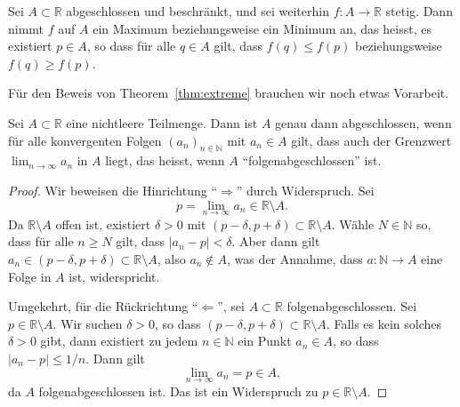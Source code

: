 \documentclass[../main.tex]{subfiles}
\begin{document}
\begin{theorem}\label{thm:extreme}
  Sei $A \subset \mathbb{R}$ abgeschlossen
  und beschränkt,
  und sei weiterhin $f \colon A \to \mathbb{R}$
  stetig. Dann nimmt $f$ auf $A$ ein
  Maximum beziehungsweise ein Minimum an,
  das heisst, es existiert $p \in A$,
  so dass für alle $q \in A$ gilt,
  dass $f(q) \leq f(p)$ beziehungsweise $f(q) \geq f(p)$.
\end{theorem}

Für den Beweis von Theorem~\ref{thm:extreme}
brauchen wir noch etwas Vorarbeit.

\begin{lemma*}[Folgenabgeschlossenheit]
  Sei $A \subset \mathbb{R}$ eine nichtleere Teilmenge.
  Dann ist $A$ genau dann abgeschlossen, wenn für
  alle konvergenten Folgen
  ${(a_{n})}_{n \in \mathbb{N}}$ mit
  $a_n \in A$ gilt, dass auch
  der Grenzwert $\lim_{n \to \infty} a_n$ in $A$ 
  liegt, das heisst, wenn $A$ ``folgenabgeschlossen'' ist.
\end{lemma*}

\begin{proof}
  Wir beweisen die Hinrichtung ``$\Rightarrow$'' durch Widerspruch.
  Sei
  \[
    p = \lim_{n \to \infty} a_n \in \mathbb{R} \setminus A.
  \]
  Da $\mathbb{R} \setminus A$ offen ist,
  existiert $\delta > 0$ mit $(p - \delta, p + \delta)
  \subset \mathbb{R} \setminus A$.
  Wähle $N \in \mathbb{N}$  so, dass für alle $n \geq N$
  gilt, dass $|a_n - p| < \delta$.
  Aber dann gilt $a_n \in (p - \delta, p + \delta)
  \subset \mathbb{R} \setminus A$,
  also $a_n \notin A$, was der Annahme, dass 
  $a \colon \mathbb{N} \to A$
  eine Folge in $A$ ist, widerspricht.

  Umgekehrt, für die Rückrichtung ``$\Leftarrow$'', sei
  $A \subset \mathbb{R}$ folgenabgeschlossen.
  Sei $p \in \mathbb{R} \setminus A$. Wir suchen
  $\delta > 0$, so dass $(p - \delta, p + \delta)
  \subset \mathbb{R} \setminus A$. Falls es kein
  solches $\delta > 0$ gibt, dann existiert zu jedem
  $n \in \mathbb{N}$ ein Punkt $a_n \in A$, so dass
  $|a_n - p| \leq 1/n$.
  Dann gilt
  \[
    \lim_{n \to \infty} a_n = p \in A,
  \]
  da $A$ folgenabgeschlossen ist. Das ist ein Widerspruch
  zu $p \in \mathbb{R} \setminus A$.
\end{proof}
\end{document}
